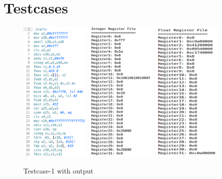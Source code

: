 \documentclass[12pt]{report}
\begin{document}
\section*{Testcases}
\begin{figure}[!htb]
\caption{Testcase-1 with output}
\centering
\includegraphics[width=0.30\textwidth]{bench1.png}
\includegraphics[width=0.30\textwidth]{bench1_intRF.png}
\includegraphics[width=0.30\textwidth]{bench1_floatRF.png}
\end{figure}
\end{document}
